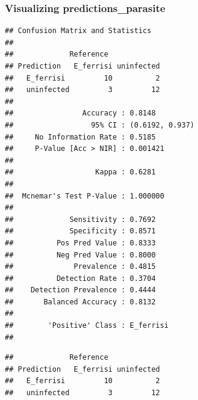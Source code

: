 \documentclass[
]{article}
\newenvironment{Shaded}{\begin{snugshade}}{\end{snugshade}}
\newcommand{\AttributeTok}[1]{\textcolor[rgb]{0.77,0.63,0.00}{#1}}
\newcommand{\FunctionTok}[1]{\textcolor[rgb]{0.00,0.00,0.00}{#1}}
\newcommand{\NormalTok}[1]{#1}
\newcommand{\OtherTok}[1]{\textcolor[rgb]{0.56,0.35,0.01}{#1}}
\newcommand{\SpecialCharTok}[1]{\textcolor[rgb]{0.00,0.00,0.00}{#1}}
\begin{document}
\hypertarget{visualizing-predictions_parasite}{%
\subsubsection{Visualizing
predictions\_parasite}\label{visualizing-predictions_parasite}}

\begin{Shaded}
\end{Shaded}

\begin{verbatim}
## Confusion Matrix and Statistics
## 
##             Reference
## Prediction   E_ferrisi uninfected
##   E_ferrisi         10          2
##   uninfected         3         12
##                                          
##                Accuracy : 0.8148         
##                  95% CI : (0.6192, 0.937)
##     No Information Rate : 0.5185         
##     P-Value [Acc > NIR] : 0.001421       
##                                          
##                   Kappa : 0.6281         
##                                          
##  Mcnemar's Test P-Value : 1.000000       
##                                          
##             Sensitivity : 0.7692         
##             Specificity : 0.8571         
##          Pos Pred Value : 0.8333         
##          Neg Pred Value : 0.8000         
##              Prevalence : 0.4815         
##          Detection Rate : 0.3704         
##    Detection Prevalence : 0.4444         
##       Balanced Accuracy : 0.8132         
##                                          
##        'Positive' Class : E_ferrisi      
## 
\end{verbatim}

\begin{Shaded}
\end{Shaded}

\begin{verbatim}
##             Reference
## Prediction   E_ferrisi uninfected
##   E_ferrisi         10          2
##   uninfected         3         12
\end{verbatim}
\end{document}
